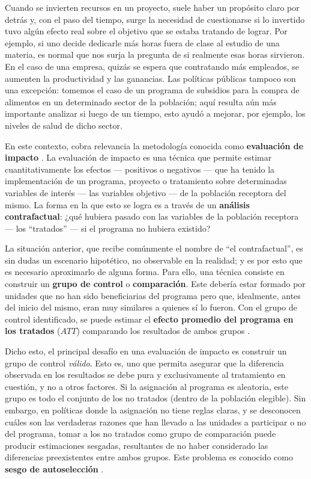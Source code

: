 \documentclass[../main.tex]{subfiles}
\begin{document}
Cuando se invierten recursos en un proyecto, suele haber un propósito claro por detrás y,
con el paso del tiempo, surge la necesidad de cuestionarse si lo invertido tuvo algún
efecto real sobre el objetivo que se estaba tratando de lograr. Por ejemplo, si uno decide
dedicarle más horas fuera de clase al estudio de una materia, es normal que nos surja la
pregunta de si realmente esas horas sirvieron. En el caso de una empresa, quizás se espera
que contratando más empleados, se aumenten la productividad y las ganancias. Las políticas
públicas tampoco son una excepción: tomemos el caso de un programa de subsidios para la
compra de alimentos en un determinado sector de la población; aquí resulta aún más
importante analizar si luego de un tiempo, esto ayudó a mejorar, por ejemplo, los niveles
de salud de dicho sector.

En este contexto, cobra relevancia la metodología conocida como \textbf{evaluación de
impacto} \cite{bernal}\cite{gertler-2016}. La evaluación de impacto es una técnica que
permite estimar cuantitativamente los efectos — positivos o negativos — que ha tenido la
implementación de un programa, proyecto o tratamiento sobre determinadas variables de
interés — las variables objetivo — de la población receptora del mismo. La forma en la que
esto se logra es a través de un \textbf{análisis contrafactual}: ¿qué hubiera pasado con
las variables de la población receptora — los ``tratados'' — si el programa no hubiera
existido?

La situación anterior, que recibe comúnmente el nombre de ``el contrafactual'', es sin
dudas un escenario hipotético, no observable en la realidad; y es por esto que es
necesario aproximarlo de alguna forma. Para ello, una técnica consiste en construir un
\textbf{grupo de control} o \textbf{comparación}. Este debería estar formado por unidades
que no han sido beneficiarias del programa pero que, idealmente, antes del inicio del
mismo, eran muy similares a quienes sí lo fueron. Con el grupo de control identificado, se
puede estimar el \textbf{efecto promedio del programa en los tratados} (\(ATT\))
comparando los resultados de ambos grupos \cite{rubin1974}.

Dicho esto, el principal desafío en una evaluación de impacto es construir un grupo de
control \textit{válido}. Esto es, uno que permita asegurar que la diferencia observada en
los resultados se debe pura y exclusivamente al tratamiento en cuestión, y no a otros
factores. Si la asignación al programa es aleatoria, este grupo es todo el conjunto de los
no tratados (dentro de la población elegible). Sin embargo, en políticas donde la
asignación no tiene reglas claras, y se desconocen cuáles son las verdaderas razones que
han llevado a las unidades a participar o no del programa, tomar a los no tratados como
grupo de comparación puede producir estimaciones sesgadas, resultantes de no haber
considerado las diferencias preexistentes entre ambos grupos. Este problema es conocido
como \textbf{sesgo de autoselección} \cite{bernal}\cite{mostly-harmless-econometrics}.
\end{document}
